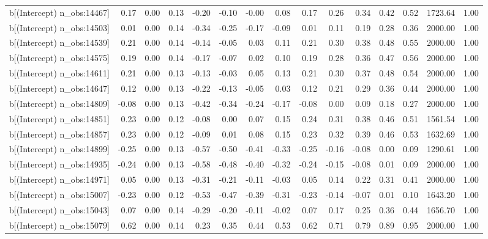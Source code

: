 \begin{table}[ht]
\begin{tabular}{rrrrrrrrrrrrrrr}
  b[(Intercept) n\_obs:14467] & 0.17 & 0.00 & 0.13 & -0.20 & -0.10 & -0.00 & 0.08 & 0.17 & 0.26 & 0.34 & 0.42 & 0.52 & 1723.64 & 1.00 \\ 
  b[(Intercept) n\_obs:14503] & 0.01 & 0.00 & 0.14 & -0.34 & -0.25 & -0.17 & -0.09 & 0.01 & 0.11 & 0.19 & 0.28 & 0.36 & 2000.00 & 1.00 \\ 
  b[(Intercept) n\_obs:14539] & 0.21 & 0.00 & 0.14 & -0.14 & -0.05 & 0.03 & 0.11 & 0.21 & 0.30 & 0.38 & 0.48 & 0.55 & 2000.00 & 1.00 \\ 
  b[(Intercept) n\_obs:14575] & 0.19 & 0.00 & 0.14 & -0.17 & -0.07 & 0.02 & 0.10 & 0.19 & 0.28 & 0.36 & 0.47 & 0.56 & 2000.00 & 1.00 \\ 
  b[(Intercept) n\_obs:14611] & 0.21 & 0.00 & 0.13 & -0.13 & -0.03 & 0.05 & 0.13 & 0.21 & 0.30 & 0.37 & 0.48 & 0.54 & 2000.00 & 1.00 \\ 
  b[(Intercept) n\_obs:14647] & 0.12 & 0.00 & 0.13 & -0.22 & -0.13 & -0.05 & 0.03 & 0.12 & 0.21 & 0.29 & 0.36 & 0.44 & 2000.00 & 1.00 \\ 
  b[(Intercept) n\_obs:14809] & -0.08 & 0.00 & 0.13 & -0.42 & -0.34 & -0.24 & -0.17 & -0.08 & 0.00 & 0.09 & 0.18 & 0.27 & 2000.00 & 1.00 \\ 
  b[(Intercept) n\_obs:14851] & 0.23 & 0.00 & 0.12 & -0.08 & 0.00 & 0.07 & 0.15 & 0.24 & 0.31 & 0.38 & 0.46 & 0.51 & 1561.54 & 1.00 \\ 
  b[(Intercept) n\_obs:14857] & 0.23 & 0.00 & 0.12 & -0.09 & 0.01 & 0.08 & 0.15 & 0.23 & 0.32 & 0.39 & 0.46 & 0.53 & 1632.69 & 1.00 \\ 
  b[(Intercept) n\_obs:14899] & -0.25 & 0.00 & 0.13 & -0.57 & -0.50 & -0.41 & -0.33 & -0.25 & -0.16 & -0.08 & 0.00 & 0.09 & 1290.61 & 1.00 \\ 
  b[(Intercept) n\_obs:14935] & -0.24 & 0.00 & 0.13 & -0.58 & -0.48 & -0.40 & -0.32 & -0.24 & -0.15 & -0.08 & 0.01 & 0.09 & 2000.00 & 1.00 \\ 
  b[(Intercept) n\_obs:14971] & 0.05 & 0.00 & 0.13 & -0.31 & -0.21 & -0.11 & -0.03 & 0.05 & 0.14 & 0.22 & 0.31 & 0.41 & 2000.00 & 1.00 \\ 
  b[(Intercept) n\_obs:15007] & -0.23 & 0.00 & 0.12 & -0.53 & -0.47 & -0.39 & -0.31 & -0.23 & -0.14 & -0.07 & 0.01 & 0.10 & 1643.20 & 1.00 \\ 
  b[(Intercept) n\_obs:15043] & 0.07 & 0.00 & 0.14 & -0.29 & -0.20 & -0.11 & -0.02 & 0.07 & 0.17 & 0.25 & 0.36 & 0.44 & 1656.70 & 1.00 \\ 
  b[(Intercept) n\_obs:15079] & 0.62 & 0.00 & 0.14 & 0.23 & 0.35 & 0.44 & 0.53 & 0.62 & 0.71 & 0.79 & 0.89 & 0.95 & 2000.00 & 1.00 \\ 

\end{tabular}
\end{table}

